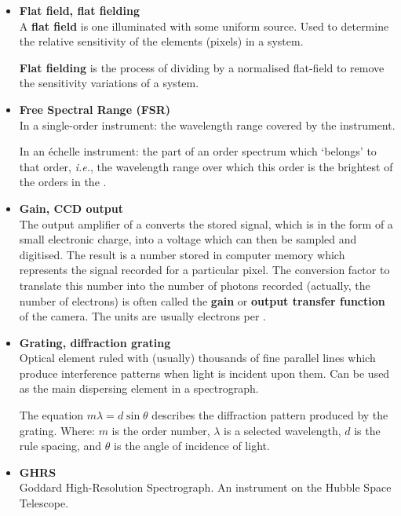 \documentclass[twoside,11pt]{starlink}
\begin{document}
\begin{itemize}
\item {\bf\label{gl_flat_field}Flat field, flat fielding}\\
      A \textbf{flat field} is one illuminated with some uniform source.
      Used to determine the relative sensitivity of the elements
      (pixels) in a system.

      \textbf{Flat fielding} is the process of dividing by a normalised
      flat-field to remove the sensitivity variations of a system.

\item {\bf\label{gl_fsr}Free Spectral Range (FSR)}\\
      In a single-order instrument: the wavelength range covered by the
      instrument.

      In an \'{e}chelle instrument:  the part of an order spectrum which
      `belongs' to that order, {\it{i.e.}}, the wavelength range over
      which this order is the brightest of the orders in the
      .

\item {\bf\label{gl_gain}Gain, CCD output}\\
      The output amplifier of a  converts the stored
      signal, which is in the form of a small electronic charge, into
      a voltage which can then be sampled and digitised.  The result
      is a number stored in computer memory which represents the signal
      recorded for a particular pixel.  The conversion factor to
      translate this number into the number of photons recorded
      (actually, the number of electrons) is often called the \textbf{gain}
      or \textbf{output transfer function} of the camera.  The units are
      usually electrons per \@.

\item {\bf\label{gl_grating}Grating, diffraction grating}\\
      Optical element ruled with (usually) thousands of fine parallel
      lines which produce interference patterns when light is incident
      upon them.  Can be used as the main dispersing element in a
      spectrograph.

      The equation $m\lambda = d\sin\theta$ describes the diffraction
      pattern produced by the grating.  Where: $m$ is the order number,
      $\lambda$ is a selected wavelength, $d$ is the rule spacing, and
      $\theta$ is the angle of incidence of light.

\item {\bf\label{gl_ghrs}GHRS}\\
      Goddard High-Resolution Spectrograph.  An instrument on the
      Hubble Space Telescope.


\end{itemize}
\end{document}

